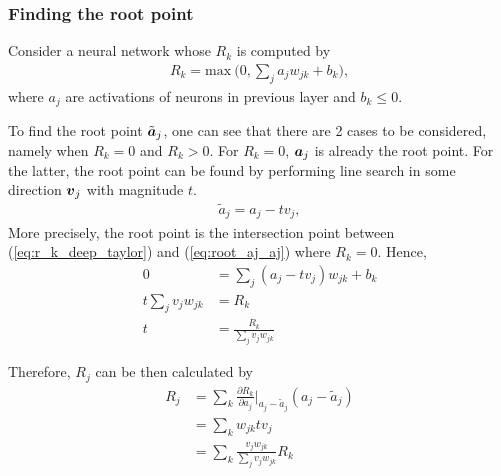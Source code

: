  
 

\subsubsection{Finding the root point}
Consider a neural network whose $R_k$ is computed by
\begin{align}\label{eq:r_k_deep_taylor}
R_k = \text{max}\ \bigg(0, \sum_{j} a_j w_{jk}  + b_k \bigg),
\end{align}
where $a_j$ are activations of neurons in previous layer and  $b_k \le 0 $.

To find the root point $\tilde{\patvector{a}}_j$, one can see that  there are  2 cases to be considered, namely when $R_k = 0$ and $R_k > 0$. For $R_k=0$,  $\patvector{a}_j$ is already the root point. For the latter, the root point can be found by performing  line search in  some direction $\patvector{v}_j$ with magnitude $t$.
\begin{align}\label{eq:root_aj_aj}
\tilde{a}_j = a_j - t v_j,
\end{align}
More precisely, the root point is the intersection point between (\ref{eq:r_k_deep_taylor}) and (\ref{eq:root_aj_aj}) where $R_k=0$. Hence,
\begin{align}
  0 &= 	\sum_{j} (a_j - t v_j) w_{jk}  + b_k\\
  t \sum_{j} v_j w_{jk} &= R_k \\
  t &= \frac{R_k}{\sum_{j} v_j w_{jk}}
\end{align}

Therefore, $R_j$ can be then calculated by
\begin{align}
R_j &= \sum_k	\frac{\partial  R_k }{ \partial a_j } \bigg|_{ a_j - \tilde{a}_j }  ( a_j - \tilde{a}_j ) \\
&=	\sum_k w_{jk} tv_j \\
&=	\sum_k \frac{ v_j w_{jk}   }{\sum_{j} v_j w_{jk}}  R_k
\end{align}

